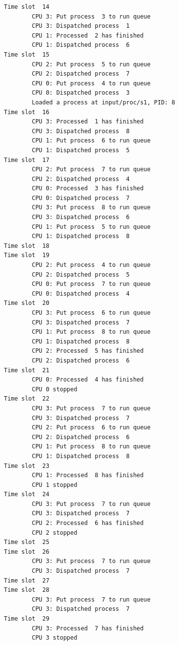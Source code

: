 \documentclass[a4paper]{article}
\numberwithin{equation}{section}
\begin{document}
\begin{mdframed}[leftline=false,rightline=false,backgroundcolor=teal!10,nobreak=false]
\begin{verbatim}
Time slot  14
        CPU 3: Put process  3 to run queue
        CPU 3: Dispatched process  1
        CPU 1: Processed  2 has finished
        CPU 1: Dispatched process  6
Time slot  15
        CPU 2: Put process  5 to run queue
        CPU 2: Dispatched process  7
        CPU 0: Put process  4 to run queue
        CPU 0: Dispatched process  3
        Loaded a process at input/proc/s1, PID: 8
Time slot  16
        CPU 3: Processed  1 has finished
        CPU 3: Dispatched process  8
        CPU 1: Put process  6 to run queue
        CPU 1: Dispatched process  5
Time slot  17
        CPU 2: Put process  7 to run queue
        CPU 2: Dispatched process  4
        CPU 0: Processed  3 has finished
        CPU 0: Dispatched process  7
        CPU 3: Put process  8 to run queue
        CPU 3: Dispatched process  6
        CPU 1: Put process  5 to run queue
        CPU 1: Dispatched process  8
Time slot  18
Time slot  19
        CPU 2: Put process  4 to run queue
        CPU 2: Dispatched process  5
        CPU 0: Put process  7 to run queue
        CPU 0: Dispatched process  4
Time slot  20
        CPU 3: Put process  6 to run queue
        CPU 3: Dispatched process  7
        CPU 1: Put process  8 to run queue
        CPU 1: Dispatched process  8
        CPU 2: Processed  5 has finished
        CPU 2: Dispatched process  6
Time slot  21
        CPU 0: Processed  4 has finished
        CPU 0 stopped
Time slot  22
        CPU 3: Put process  7 to run queue
        CPU 3: Dispatched process  7
        CPU 2: Put process  6 to run queue
        CPU 2: Dispatched process  6
        CPU 1: Put process  8 to run queue
        CPU 1: Dispatched process  8
Time slot  23
        CPU 1: Processed  8 has finished
        CPU 1 stopped
Time slot  24
        CPU 3: Put process  7 to run queue
        CPU 3: Dispatched process  7
        CPU 2: Processed  6 has finished
        CPU 2 stopped
Time slot  25
Time slot  26
        CPU 3: Put process  7 to run queue
        CPU 3: Dispatched process  7
Time slot  27
Time slot  28
        CPU 3: Put process  7 to run queue
        CPU 3: Dispatched process  7
Time slot  29
        CPU 3: Processed  7 has finished
        CPU 3 stopped


\end{verbatim}
\end{mdframed}
\end{document}
